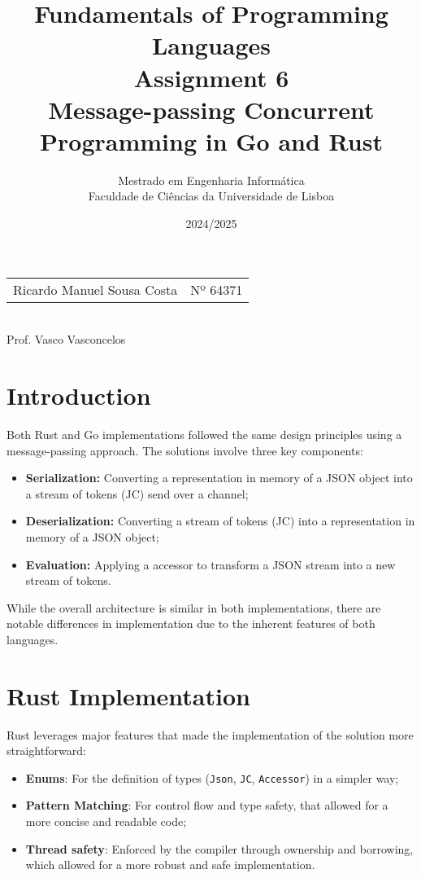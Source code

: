 \documentclass[a4paper]{article}
\title{
  Fundamentals of Programming Languages\\[1ex]
  Assignment 6\\[1ex]
  Message-passing Concurrent Programming in Go and Rust}
\author{Mestrado em Engenharia Informática\\
  Faculdade de Ciências da Universidade de Lisboa
}
\date{2024/2025}
\begin{document}
\maketitle
\setlength{\parskip}{1ex}
\thispagestyle{empty}

\begin{center}

\begin{tabular}{rl}
    Ricardo Manuel Sousa Costa & Nº 64371\\[5mm]
\end{tabular}\\

Prof. Vasco Vasconcelos

\end{center}

\clearpage

\section{Introduction}

Both Rust and Go implementations followed the same design principles using a message-passing approach.
The solutions involve three key components:

\begin{itemize}
    \item \textbf{Serialization:} Converting a representation in memory of a JSON object into a stream of tokens (JC) send over a channel;
    \item \textbf{Deserialization:} Converting a stream of tokens (JC) into a representation in memory of a JSON object;
    \item \textbf{Evaluation:} Applying a accessor to transform a JSON stream into a new stream of tokens.
\end{itemize}

While the overall architecture is similar in both implementations, there are notable differences in implementation due to the inherent features of both languages.

\section{Rust Implementation}

Rust leverages major features that made the implementation of the solution more straightforward:

\begin{itemize}
    \item \textbf{Enums}: For the definition of types (\texttt{Json}, \texttt{JC}, \texttt{Accessor}) in a simpler way;
    \item \textbf{Pattern Matching}: For control flow and type safety, that allowed for a more concise and readable code;
    \item \textbf{Thread safety}: Enforced by the compiler through ownership and borrowing, which allowed for a more robust and safe implementation.
\end{itemize}
\end{document}
